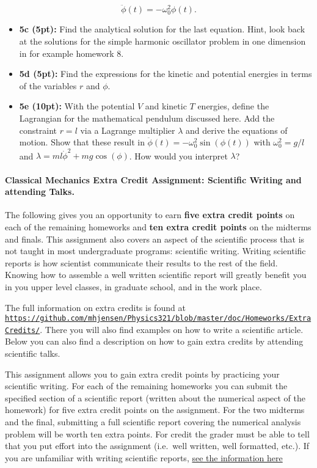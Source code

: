 \documentclass[%
oneside,                 %
final,                   %
10pt]{article}
\begin{document}
\[
\ddot{\phi}(t)=-\omega_0^2\phi(t).
\]

\begin{itemize}
\item \textbf{5c (5pt):} Find the analytical solution for the last equation. Hint, look back at the solutions for the simple harmonic oscillator problem in one dimension in for example homework 8.

\item \textbf{5d (5pt):} Find the expressions for the kinetic and potential energies in terms of the variables $r$ and $\phi$. 

\item \textbf{5e (10pt):} With the potential $V$  and kinetic $T$ energies, define the Lagrangian for the mathematical pendulum discussed here. Add the constraint $r=l$ via a Lagrange multiplier $\lambda$ and derive the equations of motion. Show that these result in  $\ddot{\phi}(t)=-\omega_0^2\sin{(\phi(t))}$ with $\omega_0^2=g/l$ and $\lambda=ml\dot{\phi}^2+mg\cos{(\phi)}$.  How would you interpret $\lambda$? 
\end{itemize}

\noindent
\paragraph{Classical Mechanics Extra Credit Assignment: Scientific Writing and attending Talks.}
The following gives you an opportunity to earn \textbf{five extra credit
points} on each of the remaining homeworks and \textbf{ten extra credit points}
on the midterms and finals.  This assignment also covers an aspect of
the scientific process that is not taught in most undergraduate
programs: scientific writing.  Writing scientific reports is how
scientist communicate their results to the rest of the field.  Knowing
how to assemble a well written scientific report will greatly benefit
you in you upper level classes, in graduate school, and in the work
place.

The full information on extra credits is found at \href{{https://github.com/mhjensen/Physics321/blob/master/doc/Homeworks/ExtraCredits/}}{\nolinkurl{https://github.com/mhjensen/Physics321/blob/master/doc/Homeworks/ExtraCredits/}}. There you will also find examples on how to write a scientific article. 
Below you can also find a description on how to gain extra credits by attending scientific talks.

This assignment allows you to gain extra credit points by practicing
your scientific writing.  For each of the remaining homeworks you can
submit the specified section of a scientific report (written about the
numerical aspect of the homework) for five extra credit points on the
assignment.  For the two midterms and the final, submitting a full
scientific report covering the numerical analysis problem will be
worth ten extra points.  For credit the grader must be able to tell
that you put effort into the assignment (i.e.~well written, well
formatted, etc.).  If you are unfamiliar with writing scientific
reports, \href{{https://github.com/mhjensen/Physics321/blob/master/doc/Homeworks/ExtraCredits/IntroductionScientificWriting.md}}{see the information here}
\end{document}
